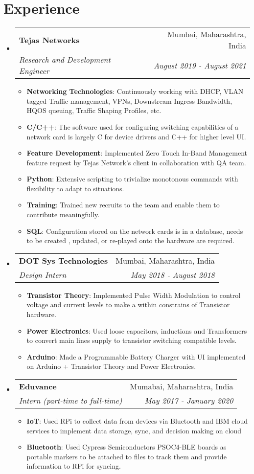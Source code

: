 \documentclass[letterpaper,11pt]{article}
\makeatletter
\newcommand{\resumeItem}[2]{
  \item\small{
    \textbf{#1}{: #2 \vspace{-2pt}}
  }
}
\newcommand{\resumeSubheading}[4]{
  \vspace{-1pt}\item
    \begin{tabular*}{0.97\textwidth}[t]{l@{\extracolsep{\fill}}r}
      \textbf{#1} & #2 \\
      \textit{\small#3} & \textit{\small #4} \\
    \end{tabular*}\vspace{-5pt}
}
\newcommand{\resumeSubHeadingListStart}{\begin{itemize}[leftmargin=*]}
\newcommand{\resumeSubHeadingListEnd}{\end{itemize}}
\newcommand{\resumeItemListStart}{\begin{itemize}}
\newcommand{\resumeItemListEnd}{\end{itemize}\vspace{-5pt}}
\makeatother
\begin{document}
\section{Experience}
	\resumeSubHeadingListStart
		\resumeSubheading
			{Tejas Networks}{Mumbai, Maharashtra, India}
			{Research and Development Engineer}{August 2019 - August 2021}
			\resumeItemListStart
				\resumeItem{Networking Technologies}{Continuously working with DHCP, VLAN tagged Traffic management, VPNs, Downstream Ingress Bandwidth, HQOS queuing, Traffic Shaping Profiles, etc.}
				\resumeItem{C/C++}{The software used for configuring switching capabilities of a network card is largely C for device drivers and C++ for higher level UI.}
				\resumeItem{Feature Development}{Implemented Zero Touch In-Band Management feature request by Tejas Network's client in collaboration with QA team.}
				\resumeItem{Python}{Extensive scripting to trivialize monotonous commands with flexibility to adapt to situations.}
				\resumeItem{Training}{Trained new recruits to the team and enable them to contribute meaningfully.}
				\resumeItem{SQL}{Configuration stored on the network cards is in a database, needs to be created , updated, or re-played onto the hardware are required.}
			\resumeItemListEnd

		\resumeSubheading
			{DOT Sys Technologies}{Mumbai, Maharashtra, India}
			{Design Intern}{May 2018 - August 2018}
			\resumeItemListStart
				\resumeItem{Transistor Theory}{Implemented Pulse Width Modulation to control voltage and current levels to make a within constrains of Transistor hardware.}
				\resumeItem{Power Electronics}{Used loose capacitors, inductions and Transformers to convert main lines supply to transistor switching compatible levels.}
				\resumeItem{Arduino}{Made a Programmable Battery Charger with UI implemented on Arduino + Transistor Theory and Power Electronics.}
			\resumeItemListEnd
     
		\resumeSubheading
			{Eduvance}{Mumabai, Maharashtra, India}
			{Intern (part-time to full-time)}{May 2017 - January 2020}
			\resumeItemListStart
				\resumeItem{IoT}{Used RPi to collect data from devices via Bluetooth and IBM cloud services to implement data storage, sync, and decision making on cloud}
				\resumeItem{Bluetooth}{Used Cypress Semiconductors PSOC4-BLE boards as portable markers to be attached to files to track them and provide information to RPi for syncing.}
			\resumeItemListEnd

	\resumeSubHeadingListEnd

\end{document}
